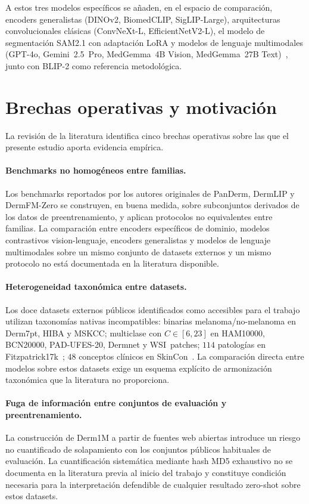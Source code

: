 A estos tres modelos específicos se añaden, en el espacio de
comparación, encoders generalistas (DINOv2, BiomedCLIP,
SigLIP-Large), arquitecturas convolucionales clásicas (ConvNeXt-L,
EfficientNetV2-L), el modelo de segmentación SAM2.1 con adaptación
LoRA y modelos de lenguaje multimodales (GPT-4o, Gemini~2.5~Pro,
MedGemma~4B Vision, MedGemma~27B Text)~\cite{amie2024}, junto con
BLIP-2 como referencia metodológica.

\section{Brechas operativas y motivación}
\label{sec:brechas}

La revisión de la literatura identifica cinco brechas operativas
sobre las que el presente estudio aporta evidencia empírica.

\paragraph{Benchmarks no homogéneos entre familias.}
Los benchmarks reportados por los autores originales de PanDerm,
DermLIP y DermFM-Zero se construyen, en buena medida, sobre
subconjuntos derivados de los datos de preentrenamiento, y aplican
protocolos no equivalentes entre familias. La comparación entre
encoders específicos de dominio, modelos contrastivos
vision-lenguaje, encoders generalistas y modelos de lenguaje
multimodales sobre un mismo conjunto de datasets externos y un
mismo protocolo no está documentada en la literatura disponible.

\paragraph{Heterogeneidad taxonómica entre datasets.}
Los doce datasets externos públicos identificados como accesibles
para el trabajo utilizan taxonomías nativas incompatibles:
binarias melanoma/no-melanoma en Derm7pt, HIBA y MSKCC;
multiclase con $C\in[6,23]$ en HAM10000, BCN20000, PAD-UFES-20,
Dermnet y WSI~patches; $114$ patologías en
Fitzpatrick17k~\cite{fitzpatrick17k}; $48$ conceptos clínicos en
SkinCon~\cite{skincon}. La comparación directa entre modelos sobre
estos datasets exige un esquema explícito de armonización
taxonómica que la literatura no proporciona.

\paragraph{Fuga de información entre conjuntos de evaluación y
preentrenamiento.}
La construcción de Derm1M a partir de fuentes web abiertas
introduce un riesgo no cuantificado de solapamiento con los
conjuntos públicos habituales de evaluación. La cuantificación
sistemática mediante hash MD5 exhaustivo no se documenta en la
literatura previa al inicio del trabajo y constituye condición
necesaria para la interpretación defendible de cualquier resultado
zero-shot sobre estos datasets.

